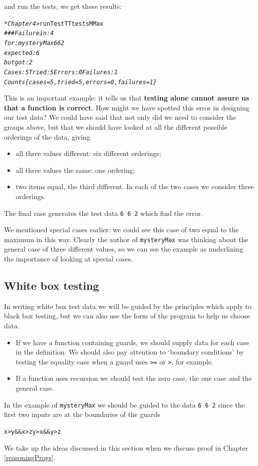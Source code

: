 and run the tests, we get these results:
\begin{alltt}
\textsl{*Chapter4>} runTestTT testsMMax
\textsl{### Failure in: 4
for: mysteryMax 6 6 2
expected: 6
 but got: 2
Cases: 5  Tried: 5  Errors: 0  Failures: 1
Counts \{cases = 5, tried = 5, errors = 0, failures = 1\}}
\end{alltt}
This is an important example: it tells us that \textbf{testing alone
cannot assure us that a function is correct}. 
How might we have spotted this error in designing our test data? We
could have said that not only did we need to consider the groups above,
but that we should have looked at all the different possible orderings
of the data, giving
\begin{itemize}
\item all three values different: six different orderings;
\item all three values the same: one ordering;
\item two items equal, the third different. In each of the two cases we
consider three orderings.
\end{itemize}
The final case generates the test data \texttt{6 6 2} which find the
error.

We mentioned special cases earlier: we could see this case of two equal
to the maximum in this way. Clearly the author of \texttt{mysteryMax}
was thinking about the general case of three different values, 
so we can see the example as underlining the importance of
looking at special cases.

\subsection*{White box testing}

In writing white box test data we will be guided by the principles
which apply to black box testing, but we can also use the form of the
program to help us choose data.
\begin{itemize}
\item If we have a function containing guards, we should supply data
for each case in the definition. We should also pay attention to
`boundary conditions' by testing the equality case when a guard uses
\texttt{>=} or \texttt{>}, for example.
\item If a function uses recursion we should test the zero case, the one
case and the general case.
\end{itemize}
In the example of \texttt{mysteryMax} we should be guided to the data 
\texttt{6 6 2} since the first two inputs are at the boundaries of the
guards
\begin{alltt}
x > y \&\& x > z                       y > x \&\& y > z
\end{alltt}
We take up the ideas discussed in this section when we discuss proof in
Chapter \ref{reasoningProgs}.


